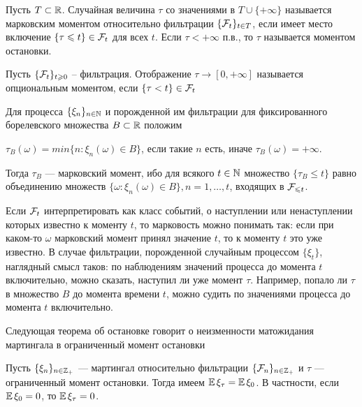 \begin{definition}
    Пусть $T \subset \mathbb{R}$. Случайная величина $\tau$ со значениями в $T \cup \{+\infty\}$ называется марковским моментом относительно фильтрации $\{\mathcal{F}_t\}_{t\in T}$, если имеет место включение $\{ \tau \leqslant t \} \in \mathcal{F}_t$ для всех $t$. Если $\tau < +\infty$ п.в., то $\tau$ называется моментом остановки.
\end{definition}

\begin{definition}
    Пусть $\{\mathcal{F}_t\}_{t \geqslant 0}$ -- фильтрация. Отображение $\tau \to [0, +\infty]$ называется опциональным моментом, если $\{\tau < t\} \in \mathcal{F}_t$
\end{definition}

\begin{example}
    Для процесса $\{\xi_n\}_{n \in \mathbb{N}}$ и порожденной им фильтрации для фиксированного борелевского множества $B \subset \mathbb{R}$ положим
    
    $\tau_B(\omega) = min\{n: \xi_n(\omega) \in B\}$, если такие $n$ есть, иначе $\tau_B(\omega) = +\infty$.
    
    Тогда $\tau_B$ — марковский момент, ибо для всякого $t \in \mathbb{N}$ множество $\{\tau_B \leq t\}$ равно объединению множеств $\{\omega: \xi_n(\omega) \in B\}, n = 1, \ldots, t$, входящих в $\mathcal{F}_{\leqslant t}$.

    Если $\mathcal{F}_t$ интерпретировать как класс событий, о наступлении или ненаступлении которых известно к моменту $t$, то марковость можно понимать так: если при каком-то $\omega$ марковский момент принял значение $t$, то к моменту $t$ это уже известно. В случае фильтрации, порожденной случайным процессом $\{\xi_t\}$, наглядный смысл таков: по наблюдениям значений процесса до момента $t$ включительно, можно сказать, наступил ли уже момент $\tau$. Например, попало ли $\tau$ в множество $B$ до момента времени $t$, можно судить по значениями процесса до момента $t$ включительно.
\end{example}

\begin{note}
    Следующая теорема об остановке говорит о неизменности матожидания мартингала в ограниченный момент остановки
\end{note}

\begin{theorem}
    Пусть $\{\xi_n\}_{n\in \mathbb{Z}_+}$ — мартингал относительно фильтрации $\{\mathcal{F}_n\}_{n \in \mathbb{Z}_+}$ и $\tau$ — ограниченный момент остановки. Тогда имеем $\operatorname{\mathbb{E}} \xi_\tau = \operatorname{\mathbb{E}} \xi_0$. В частности, если $\operatorname{\mathbb{E}} \xi_0 = 0$, то $\operatorname{\mathbb{E}} \xi_\tau = 0$.
\end{theorem}